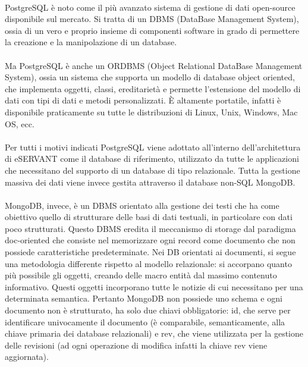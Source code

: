 \paragraph{}

PostgreSQL è noto come il più avanzato sistema di gestione di dati open-source
disponibile sul mercato.
Si tratta di un DBMS (DataBase Management System), ossia di un vero e proprio insieme di componenti software in grado di permettere la creazione e la manipolazione di un database.
\paragraph{}

Ma PostgreSQL è anche un ORDBMS (Object Relational DataBase Management System), ossia un sistema che supporta un modello di database object oriented, che implementa oggetti, classi, ereditarietà e permette l’estensione del modello di dati con tipi di dati e metodi
personalizzati.
È altamente portatile, infatti è disponibile praticamente su tutte le distribuzioni di Linux, Unix, Windows, Mac OS, ecc.
\paragraph{}

Per tutti i motivi indicati PostgreSQL viene adottato all’interno dell’architettura di eSERVANT come il database di riferimento, utilizzato da tutte le applicazioni che necessitano del supporto di un database di tipo relazionale.
Tutta la gestione massiva dei dati viene invece gestita attraverso il database non-SQL
MongoDB.

\paragraph{}
MongoDB, invece, è un DBMS orientato alla gestione dei testi che ha come obiettivo quello di strutturare delle basi di dati testuali, in particolare con dati poco strutturati.
Questo DBMS eredita il meccanismo di storage dal paradigma doc-oriented che consiste nel memorizzare ogni record come documento che non possiede caratteristiche predeterminate.
Nei DB orientati ai documenti, si segue una metodologia differente rispetto al modello relazionale: si accorpano quanto più possibile gli oggetti, creando delle macro entità dal massimo contenuto informativo. Questi oggetti incorporano tutte le notizie di cui necessitano per una determinata semantica.
Pertanto MongoDB non possiede uno schema e ogni documento non è strutturato, ha solo due chiavi obbligatorie:
id, che serve per identificare univocamente il documento (è comparabile, semanticamente, alla chiave primaria dei database relazionali)
e rev, che viene utilizzata per la gestione delle revisioni (ad ogni operazione di modifica infatti la chiave rev viene aggiornata).
